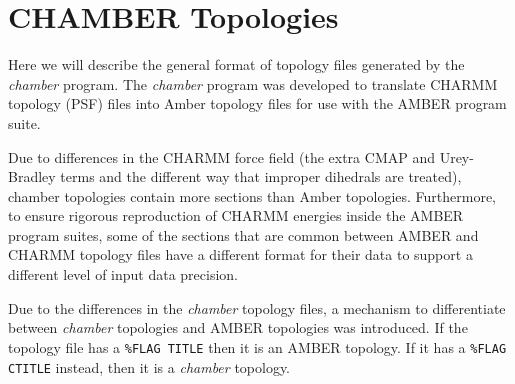 \section{CHAMBER Topologies}

Here we will describe the general format of topology files generated by the
\emph{chamber} program. The \emph{chamber} program was developed to translate
CHARMM topology (PSF) files into Amber topology files for use with the AMBER
program suite.

Due to differences in the CHARMM force field (\eg the extra CMAP and
Urey-Bradley terms and the different way that improper dihedrals are treated),
chamber topologies contain more sections than Amber topologies. Furthermore, to
ensure rigorous reproduction of CHARMM energies inside the AMBER program suites,
some of the sections that are common between AMBER and CHARMM topology files
have a different format for their data to support a different level of
input data precision.

Due to the differences in the \emph{chamber} topology files, a mechanism to
differentiate between \emph{chamber} topologies and AMBER topologies was
introduced. If the topology file has a {\tt \%FLAG TITLE} then it is an AMBER
topology. If it has a {\tt \%FLAG CTITLE} instead, then it is a \emph{chamber}
topology.

